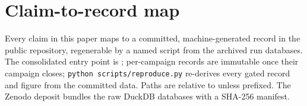 \section{Claim-to-record map}
\label{app:traceability}

Every claim in this paper maps to a committed, machine-generated record in
the public repository, regenerable by a named script from the archived run
databases. The consolidated entry point is
; per-campaign records are
immutable once their campaign closes; \texttt{python scripts/reproduce.py}
re-derives every gated record and figure from the committed data. Paths
are relative to  unless prefixed. The Zenodo
deposit \citep{polyforge2026zenodo} bundles the raw DuckDB databases with
a SHA-256 manifest.

